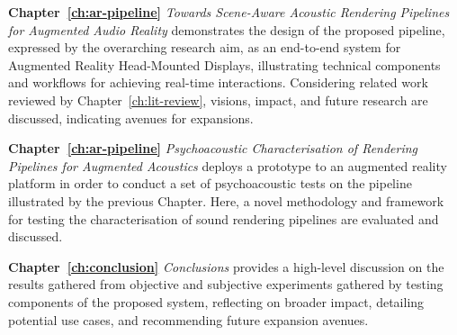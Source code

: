 \textbf{Chapter~\ref{ch:ar-pipeline}} \textit{Towards Scene-Aware Acoustic Rendering Pipelines for Augmented Audio Reality} demonstrates the design of the proposed pipeline, expressed by the overarching research aim, as an end-to-end system for Augmented Reality Head-Mounted Displays, illustrating technical components and workflows for achieving real-time interactions. Considering related work reviewed by Chapter~\ref{ch:lit-review}, visions, impact, and future research are discussed, indicating avenues for expansions.

\textbf{Chapter~\ref{ch:ar-pipeline}} \textit{Psychoacoustic Characterisation of Rendering Pipelines for Augmented Acoustics} deploys a prototype to an augmented reality platform in order to conduct a set of psychoacoustic tests on the pipeline illustrated by the previous Chapter. Here, a novel methodology and framework for testing the characterisation of sound rendering pipelines are evaluated and discussed.

\textbf{Chapter~\ref{ch:conclusion}} \textit{Conclusions} provides a high-level discussion on the results gathered from objective and subjective experiments gathered by testing components of the proposed system, reflecting on broader impact, detailing potential use cases, and recommending future expansion avenues.

